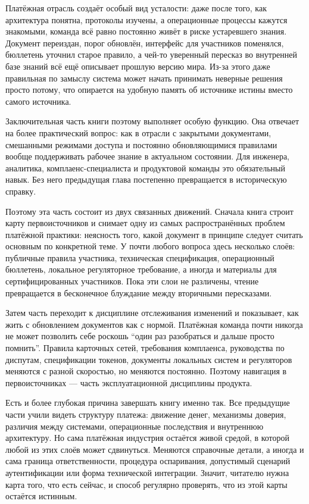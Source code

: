 Платёжная отрасль создаёт особый вид усталости: даже после того,
как архитектура понятна, протоколы изучены, а операционные процессы
кажутся знакомыми, команда всё равно постоянно живёт в риске
устаревшего знания. Документ переиздан, порог обновлён, интерфейс
для участников поменялся, бюллетень уточнил старое правило, а чей-то
уверенный пересказ во внутренней базе знаний всё ещё описывает прошлую
версию мира. Из-за этого даже правильная по замыслу система может
начать принимать неверные решения просто потому, что опирается
на удобную память об источнике истины вместо самого источника.

Заключительная часть книги поэтому выполняет особую функцию. Она отвечает на более практический
вопрос: как в отрасли с закрытыми документами, смешанными режимами
доступа и постоянно обновляющимися правилами вообще поддерживать
рабочее знание в актуальном состоянии. Для инженера, аналитика,
комплаенс-специалиста и продуктовой команды это обязательный
навык. Без него предыдущая глава постепенно превращается в
историческую справку.

Поэтому эта часть состоит из двух связанных движений. Сначала книга
строит карту первоисточников и снимает одну из самых распространённых
проблем платёжной практики: неясность того, какой документ в принципе
следует считать основным по конкретной теме. У почти любого вопроса
здесь несколько слоёв: публичные правила участника, техническая
спецификация, операционный бюллетень, локальное регуляторное
требование, а иногда и материалы для сертифицированных участников.
Пока эти слои не различены, чтение превращается в бесконечное
блуждание между вторичными пересказами.

Затем часть переходит к дисциплине отслеживания изменений и показывает,
как жить с обновлением документов как с нормой.
Платёжная команда почти никогда не может позволить себе
роскошь \enquote{один раз разобраться и дальше просто помнить}.
Правила карточных сетей, требования комплаенса, руководства по
диспутам, спецификации токенов, документы локальных систем
и регуляторов меняются с разной скоростью, но меняются постоянно.
Поэтому навигация в первоисточниках --- часть эксплуатационной дисциплины продукта.

Есть и более глубокая причина завершать книгу именно так. Все
предыдущие части учили видеть структуру платежа: движение денег,
механизмы доверия, различия между системами, операционные последствия
и внутреннюю архитектуру. Но сама платёжная индустрия остаётся живой
средой, в которой любой из этих слоёв может сдвинуться. Меняются
справочные детали, а иногда и сама граница ответственности,
процедура оспаривания, допустимый сценарий аутентификации или форма
технической интеграции. Значит, читателю нужна карта того, что есть сейчас, и способ регулярно проверять, что из этой карты остаётся истинным.

